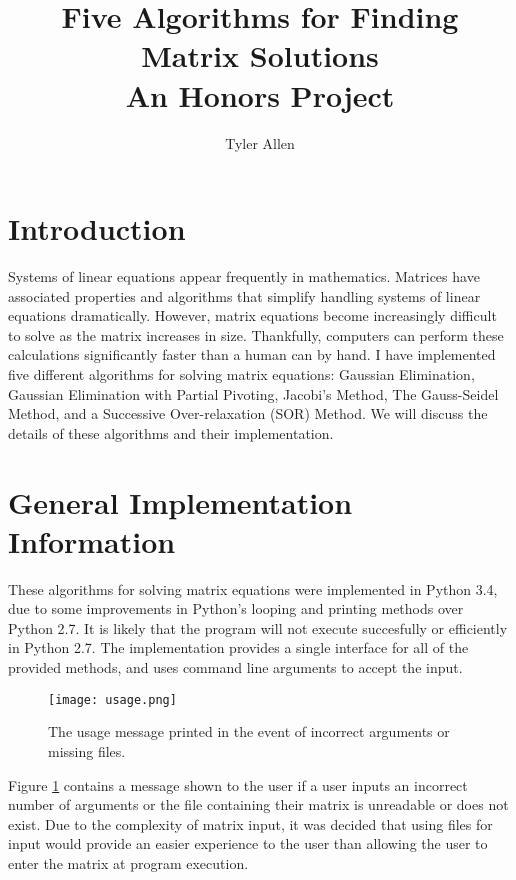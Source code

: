 \documentclass[12pt]{article}
\begin{document}
\title{Five Algorithms for Finding Matrix Solutions\\An Honors Project}
\author{Tyler Allen}
\date{}

\maketitle

\section{Introduction}

Systems of linear equations appear frequently in mathematics. Matrices have 
associated properties and algorithms that simplify handling systems of linear
equations dramatically. However, matrix equations become increasingly difficult to 
solve as the matrix increases in size. Thankfully, computers can perform these calculations
significantly faster than a human can by hand. I have implemented five different
algorithms for solving matrix equations: Gaussian Elimination, Gaussian Elimination with
Partial Pivoting, Jacobi's Method, The Gauss-Seidel Method, and a 
Successive Over-relaxation (SOR) Method. We will discuss the details of these 
algorithms and their implementation.



\section{General Implementation Information}
These algorithms for solving matrix equations  were implemented in Python 3.4, due to some improvements 
in Python's looping and printing methods over Python 2.7. It is likely that the
program will not execute succesfully or efficiently in Python 2.7. The implementation
provides a single interface for all of the provided methods, and uses command line 
arguments to accept the input. 

\begin{figure}[H]
\texttt{[image: usage.png]}
\caption{The usage message printed in the event of incorrect arguments or missing files.}
\label{usage}
\end{figure}

Figure \ref{usage} contains a message shown to the user if a user inputs an incorrect
number of arguments or the file containing their matrix is unreadable or does not 
exist. Due to the complexity of matrix input, it was decided that using files for 
input would provide an easier experience to the user than allowing the user to 
enter the matrix at program execution.
\end{document}

